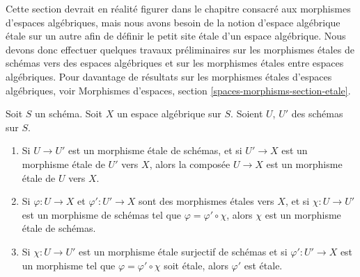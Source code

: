 \noindent
Cette section devrait en réalité figurer dans le chapitre consacré aux morphismes d'espaces
algébriques, mais nous avons besoin de la notion d'espace algébrique \'etale sur un autre
afin de définir le petit site \'etale d'un espace algébrique.
Nous devons donc effectuer quelques travaux préliminaires sur les morphismes \'etales de schémas vers des
espaces algébriques et sur les morphismes \'etales entre espaces algébriques.
Pour davantage de résultats sur les morphismes \'etales d'espaces algébriques, voir
Morphismes d'espaces, section \ref{spaces-morphisms-section-etale}.

\begin{lemma}
\label{lemma-etale-over-space}
Soit $S$ un schéma.
Soit $X$ un espace algébrique sur $S$.
Soient $U$, $U'$ des schémas sur $S$.
\begin{enumerate}
\item Si $U \to U'$ est un morphisme \'etale de schémas, et
si $U' \to X$ est un morphisme \'etale de $U'$ vers $X$, alors la
composée $U \to X$ est un morphisme \'etale de $U$ vers $X$.
\item Si $\varphi : U \to X$ et $\varphi' : U' \to X$ sont des
morphismes \'etales vers $X$, et si $\chi : U \to U'$ est un
morphisme de schémas tel que $\varphi = \varphi' \circ \chi$,
alors $\chi$ est un morphisme \'etale de schémas.
\item Si $\chi : U \to U'$ est un morphisme \'etale surjectif
de schémas et si $\varphi' : U' \to X$ est un morphisme tel que
$\varphi = \varphi' \circ \chi$ soit \'etale, alors $\varphi'$
est \'etale.
\end{enumerate}
\end{lemma}

